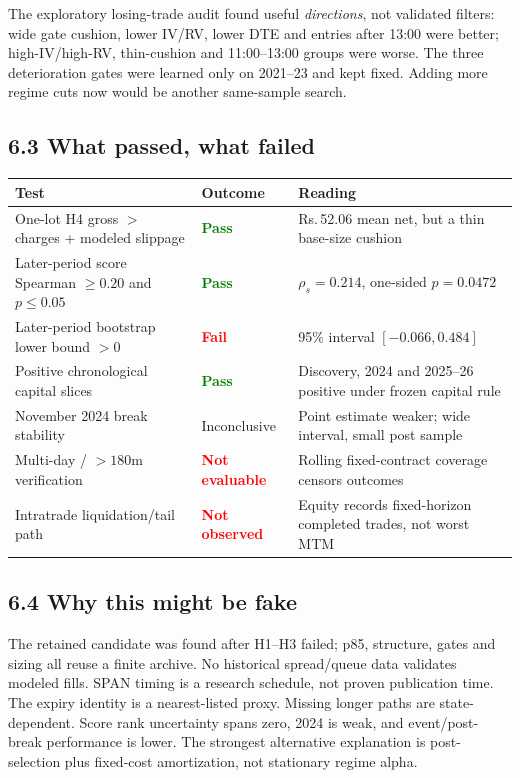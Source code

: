 \documentclass[10pt,a4paper]{article}
\newcommand{\INR}{\textsf{Rs.}\,}
\newcommand{\good}[1]{\textcolor{Green}{\textbf{#1}}}
\newcommand{\bad}[1]{\textcolor{Red}{\textbf{#1}}}
\begin{document}
The exploratory losing-trade audit found useful \emph{directions}, not validated filters: wide gate cushion, lower IV/RV, lower DTE and entries after 13:00 were better; high-IV/high-RV, thin-cushion and 11:00--13:00 groups were worse. The three deterioration gates were learned only on 2021--23 and kept fixed. Adding more regime cuts now would be another same-sample search.

\subsection*{6.3 What passed, what failed}
\begin{tabularx}{\linewidth}{@{}p{44mm}p{28mm}Y@{}}
\toprule
Test & Outcome & Reading \\
\midrule
One-lot H4 gross $>$ charges + modeled slippage & \good{Pass} & \INR52.06 mean net, but a thin base-size cushion \\
Later-period score Spearman $\ge0.20$ and $p\le0.05$ & \good{Pass} & $\rho_s=0.214$, one-sided $p=0.0472$ \\
Later-period bootstrap lower bound $>0$ & \bad{Fail} & 95\% interval $[-0.066,0.484]$ \\
Positive chronological capital slices & \good{Pass} & Discovery, 2024 and 2025--26 positive under frozen capital rule \\
November 2024 break stability & Inconclusive & Point estimate weaker; wide interval, small post sample \\
Multi-day / $>180$m verification & \bad{Not evaluable} & Rolling fixed-contract coverage censors outcomes \\
Intratrade liquidation/tail path & \bad{Not observed} & Equity records fixed-horizon completed trades, not worst MTM \\
\bottomrule
\end{tabularx}

\subsection*{6.4 Why this might be fake}
The retained candidate was found after H1--H3 failed; p85, structure, gates and sizing all reuse a finite archive. No historical spread/queue data validates modeled fills. SPAN timing is a research schedule, not proven publication time. The expiry identity is a nearest-listed proxy. Missing longer paths are state-dependent. Score rank uncertainty spans zero, 2024 is weak, and event/post-break performance is lower. The strongest alternative explanation is post-selection plus fixed-cost amortization, not stationary regime alpha.
\end{document}
